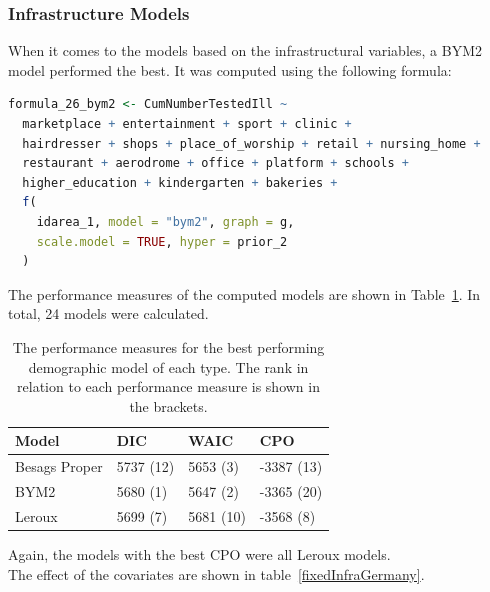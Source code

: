 \subsubsection{Infrastructure Models}
When it comes to the models based on the infrastructural variables, a BYM2 model performed the best. It was computed using the following formula: 
\begin{lstlisting}[language=R]
formula_26_bym2 <- CumNumberTestedIll ~
  marketplace + entertainment + sport + clinic +
  hairdresser + shops + place_of_worship + retail + nursing_home +
  restaurant + aerodrome + office + platform + schools + 
  higher_education + kindergarten + bakeries + 
  f(
    idarea_1, model = "bym2", graph = g,
    scale.model = TRUE, hyper = prior_2
  )
\end{lstlisting}
The performance measures of the computed models are shown in Table~\ref{infraGermany}. In total, 24 models were calculated.
\begin{table}[H] 
\caption{The performance measures for the best performing demographic model of each type. The rank in relation to each performance measure is shown in the brackets. \label{infraGermany}}
\begin{tabular}{l l l l}
\toprule
\textbf{Model}	& \textbf{DIC}	& \textbf{WAIC} & \textbf{CPO} \\
\midrule
Besags Proper & 5737 (12) & 5653 (3) & -3387 (13)\\
BYM2 & 5680 (1) & 5647 (2) & -3365 (20)\\
Leroux & 5699 (7) & 5681 (10) & -3568 (8) \\
\bottomrule
\end{tabular}
\end{table}
Again, the models with the best CPO were all Leroux models. \\
The effect of the covariates are shown in table~\ref{fixedInfraGermany}.

